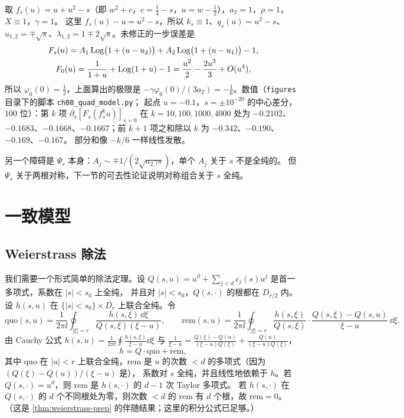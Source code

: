 \begin{example}\label{ch8:exa:quad-divergence}
取 $f_s(u)=u+u^2-s$（即 $w^2+c$，$c=\frac14-s$，$u=w-\frac12$），$a_2=1$，$\rho=1$，$X\equiv1$，$\gamma=1$。
这里 $f_s(u)-u=u^2-s$，所以 $k_s\equiv1$、$q_s(u)=u^2-s$、$u_{1,2}=\mp\sqrt s$、$\lambda_{1,2}=1\mp2\sqrt s$。未修正的一步误差是
\[
\begin{gathered}
 F_s(u)=A_1\operatorname{Log}\bigl(1+(u-u_2)\bigr)+A_2\operatorname{Log}\bigl(1+(u-u_1)\bigr)-1,\\
 F_0(u)=\frac1{1+u}+\operatorname{Log}(1+u)-1=\frac{u^2}2-\frac{2u^3}3+O(u^4),
\end{gathered}
\]
所以 $\varphi_0(0)=\frac12$，上面算出的极限是 $-\gamma\varphi_0(0)/(3a_2)=-\frac16$。数值（\texttt{figures} 目录下的脚本 \texttt{ch08\_quad\_model.py}；
起点 $u=-0.1$，$s=\pm10^{-20}$ 的中心差分，$100$ 位）：第 $k$ 项 $\partial_s[F_s(f_s^ku)]_{s=0}$ 在 $k=10,100,1000,4000$ 处为
$-0.2102$、$-0.1683$、$-0.1668$、$-0.1667$；前 $k+1$ 项之和除以 $k$ 为 $-0.342$、$-0.190$、$-0.169$、$-0.167$。
部分和像 $-k/6$ 一样线性发散。
\end{example}

\begin{remark}
另一个障碍是 $\Psi_s$ 本身：$A_j\sim\mp1/(2\sqrt{a_2\gamma s})$，单个 $A_j$ 关于 $s$ 不是全纯的。
但 $\Psi_s$ 关于两根对称，下一节的可去性论证说明对称组合关于 $s$ 全纯。
\end{remark}

\section{一致模型}\label{ch8:sec:model}

\subsection{Weierstrass 除法}
我们需要一个形式简单的除法定理。设 $Q(s,u)=u^d+\sum_{j<d}c_j(s)u^j$ 是首一多项式，系数在 $|s|<s_0$ 上全纯，
并且对 $|s|<s_0$，$Q(s,\cdot)$ 的根都在 $D_{r/2}$ 内。设 $h(s,u)$ 在 $\{|s|<s_0\}\times\overline{D_r}$ 上联合全纯。令
\begin{equation}\label{ch8:eq:division}
 \mathrm{quo}(s,u)=\frac1{2\pi\ii}\oint_{|\xi|=r}\frac{h(s,\xi)\,\dd\xi}{Q(s,\xi)(\xi-u)},\qquad
 \mathrm{rem}(s,u)=\frac1{2\pi\ii}\oint_{|\xi|=r}\frac{h(s,\xi)}{Q(s,\xi)}\cdot\frac{Q(s,\xi)-Q(s,u)}{\xi-u}\,\dd\xi .
\end{equation}
由 Cauchy 公式 $h(s,u)=\frac1{2\pi\ii}\oint\frac{h(s,\xi)}{\xi-u}\dd\xi$ 与 $\frac1{\xi-u}=\frac{Q(\xi)-Q(u)}{(\xi-u)Q(\xi)}+\frac{Q(u)}{(\xi-u)Q(\xi)}$，
\begin{equation}\label{ch8:eq:division2}
 h=Q\cdot\mathrm{quo}+\mathrm{rem},
\end{equation}
其中 $\mathrm{quo}$ 在 $|u|<r$ 上联合全纯，$\mathrm{rem}$ 是 $u$ 的次数 $<d$ 的多项式（因为 $(Q(\xi)-Q(u))/(\xi-u)$ 是），
系数对 $s$ 全纯，并且线性地依赖于 $h$。若 $Q(s,\cdot)=u^d$，则 $\mathrm{rem}$ 是 $h(s,\cdot)$ 的 $d-1$ 次 Taylor 多项式。
若 $h(s,\cdot)$ 在 $Q(s,\cdot)$ 的 $d$ 个不同根处为零，则次数 $<d$ 的 $\mathrm{rem}$ 有 $d$ 个根，故 $\mathrm{rem}=0$。
（这是 \cref{thm:weierstrass-prep} 的伴随结果；这里的积分公式已足够。）


